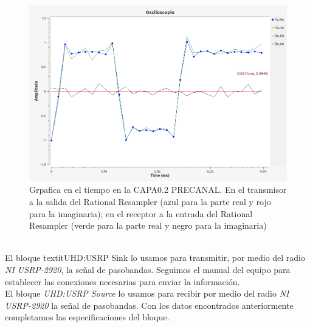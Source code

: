 \begin{itemize}
\vspace{200px}
\begin{figure}[h!]
	\captionsetup{justification = raggedright, singlelinecheck = false}
	\caption{Grpafica en el tiempo en la CAPA0.2 PRECANAL. En el transmisor a la salida del Rational Resampler (azul para la parte real y rojo para la imaginaria); en el receptor a la entrada del Rational Resampler (verde para la parte real y negro para la imaginaria)}
	\label{fig:ej1_precanal_tiempo_capa02}
\includegraphics[width=0.8\linewidth]{Imagenes/tiempocanal03.png}
\centering
\end{figure}


\end{itemize}
\ \\ %

El bloque textit{UHD:USRP Sink} lo usamos para transmitir, por medio del radio \textit{NI USRP-2920}, la señal de pasobandas. Seguimos el manual del equipo para establecer las conexiones necesarias para enviar la información.
\ \\ %

El bloque \textit{UHD:USRP Source} lo usamos para recibir por medio del radio \textit{NI USRP-2920} la señal de pasobandas. Con los datos encontrados anteriormente completamos las especificaciones del bloque.

